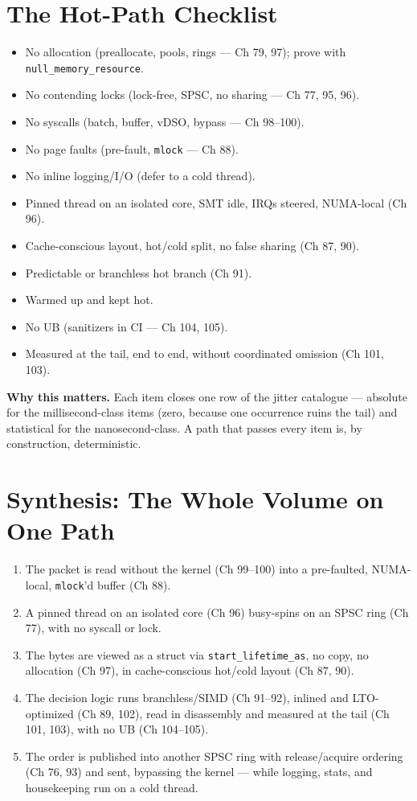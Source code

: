 \section{The Hot-Path Checklist}
\begin{itemize}
\item No allocation (preallocate, pools, rings --- Ch 79, 97); prove with \texttt{null\_memory\_resource}.
\item No contending locks (lock-free, SPSC, no sharing --- Ch 77, 95, 96).
\item No syscalls (batch, buffer, vDSO, bypass --- Ch 98--100).
\item No page faults (pre-fault, \texttt{mlock} --- Ch 88).
\item No inline logging/I/O (defer to a cold thread).
\item Pinned thread on an isolated core, SMT idle, IRQs steered, NUMA-local (Ch 96).
\item Cache-conscious layout, hot/cold split, no false sharing (Ch 87, 90).
\item Predictable or branchless hot branch (Ch 91).
\item Warmed up and kept hot.
\item No UB (sanitizers in CI --- Ch 104, 105).
\item Measured at the tail, end to end, without coordinated omission (Ch 101, 103).
\end{itemize}

\textbf{Why this matters.} Each item closes one row of the jitter catalogue --- absolute for the millisecond-class items (zero, because one occurrence ruins the tail) and statistical for the nanosecond-class. A path that passes every item is, by construction, deterministic.

\section{Synthesis: The Whole Volume on One Path}
\begin{enumerate}
\item The packet is read without the kernel (Ch 99--100) into a pre-faulted, NUMA-local, \texttt{mlock}'d buffer (Ch 88).
\item A pinned thread on an isolated core (Ch 96) busy-spins on an SPSC ring (Ch 77), with no syscall or lock.
\item The bytes are viewed as a struct via \texttt{start\_lifetime\_as}, no copy, no allocation (Ch 97), in cache-conscious hot/cold layout (Ch 87, 90).
\item The decision logic runs branchless/SIMD (Ch 91--92), inlined and LTO-optimized (Ch 89, 102), read in disassembly and measured at the tail (Ch 101, 103), with no UB (Ch 104--105).
\item The order is published into another SPSC ring with release/acquire ordering (Ch 76, 93) and sent, bypassing the kernel --- while logging, stats, and housekeeping run on a cold thread.
\end{enumerate}

